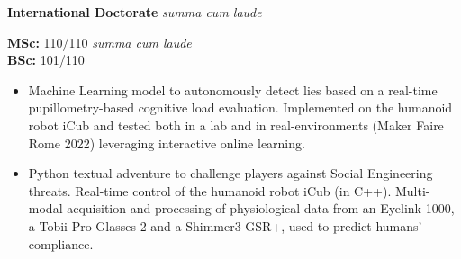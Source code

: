 
\textbf{International Doctorate} \textit{summa cum laude}

\divider

\textbf{MSc:} 110/110 \textit{summa cum laude}\\ 
\textbf{BSc:} 101/110







\begin{itemize}
\item Machine Learning model to autonomously detect lies based on a real-time pupillometry-based cognitive load evaluation. Implemented on the humanoid robot iCub and tested both in a lab and in real-environments (Maker Faire Rome 2022) leveraging interactive online learning.
\end{itemize}
\smallskip


\begin{itemize}
\item Python textual adventure to challenge players against Social Engineering threats. Real-time control of the humanoid robot iCub (in C++). Multi-modal acquisition and processing of physiological data from an Eyelink 1000, a Tobii Pro Glasses 2 and a Shimmer3 GSR+, used to predict humans' compliance.
\end{itemize}
\smallskip

